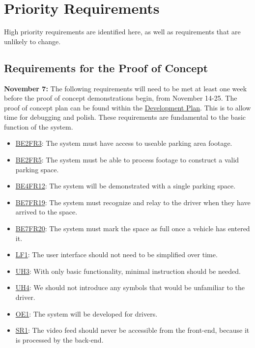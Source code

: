\documentclass[12pt,letterpaper]{article}
\begin{document}
\newpage
\section{Priority Requirements}
\label{priorityreqs}
High priority requirements are identified here, as well as requirements that are
unlikely to change.

\subsection{Requirements for the Proof of Concept}
\textbf{November 7:} The following requirements will need to be met at least one
week before the proof of concept demonstrations begin, from November 14-25. The
proof of concept plan can be found within the
\href{https://github.com/parkd-app/park-d/blob/main/docs/DevelopmentPlan/DevelopmentPlan.pdf}
{Development Plan}. This is to allow time for debugging and polish. These
requirements are fundamental to the basic function of the system.
\begin{itemize}
    \item \hyperref[poc1]{BE2FR3}: The system must have access to useable
    parking area footage.
    \item \hyperref[poc2]{BE2FR5}: The system must be able to process footage to
    construct a valid parking space.
    \item \hyperref[poc3]{BE4FR12}: The system will be demonstrated with a
    single parking space.
    \item \hyperref[poc4]{BE7FR19}: The system must recognize and relay to the
    driver when they have arrived to the space.
    \item \hyperref[poc5]{BE7FR20}: The system must mark the space as full once
    a vehicle has entered it.
    \item \hyperref[pocnf1]{LF1}: The user interface should not need to be
    simplified over time.
    \item \hyperref[pocnf2]{UH3}: With only basic functionality, minimal
    instruction should be needed.
    \item \hyperref[pocnf3]{UH4}: We should not introduce any symbols that would
    be unfamiliar to the driver.
    \item \hyperref[pocnf4]{OE1}: The system will be developed for drivers.
    \item \hyperref[pocnf5]{SR1}: The video feed should never be accessible from
    the front-end, because it is processed by the back-end.
\end{itemize}
\end{document}
